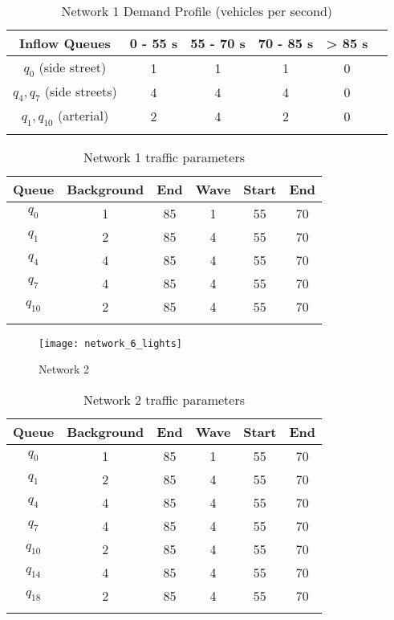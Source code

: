 \begin{table}[h]
\caption{Network 1 Demand Profile (vehicles per second)}
\label{tab:net1wave}
\centering
\begin{tabular}{cccccc}
\toprule
Inflow Queues & 0 - 55 s & 55 - 70 s & 70 - 85 s & > 85 s\\ 
\midrule
$q_0$ (side street)& 1 & 1 & 1 & 0 \\
$q_4, q_7$ (side streets)& 4 & 4 & 4 & 0 \\
$q_1,q_{10}$ (arterial)& 2 & 4 & 2 & 0 \\
\bottomrule\\
\end{tabular}
\end{table}

\begin{table}[h]
\caption{Network 1 traffic parameters}
\label{tab:net1wave_old}
\centering
\begin{tabular}{cccccc}
\toprule
Queue & Background & End & Wave & Start &End\\ 
\midrule
$q_0$ & 1 & 85 & 1 & 55 & 70\\
$q_1$ & 2 & 85 & 4 & 55 & 70\\
$q_4$ & 4 & 85 & 4 & 55 & 70\\
$q_7$ & 4 & 85 & 4 & 55 & 70\\
$q_{10}$ & 2 & 85 & 4 & 55 & 70\\
\bottomrule\\
\end{tabular}
\end{table}


\begin{figure*}[t!]
\centering
\texttt{[image: network\_6\_lights]}
\caption{Network 2}
\label{fig:network6}
\end{figure*}

\begin{table}[h]
\caption{Network 2 traffic parameters}
\label{tab:net2wave}
\centering
\begin{tabular}{cccccc}
\toprule
Queue & Background & End & Wave & Start &End\\ 
\midrule
$q_0$ & 1 & 85 & 1 & 55 & 70\\
$q_1$ & 2 & 85 & 4 & 55 & 70\\
$q_4$ & 4 & 85 & 4 & 55 & 70\\
$q_7$ & 4 & 85 & 4 & 55 & 70\\
$q_{10}$ & 2 & 85 & 4 & 55 & 70\\
$q_{14}$ & 4 & 85 & 4 & 55 & 70\\
$q_{18}$ & 2 & 85 & 4 & 55 & 70\\
\bottomrule\\
\end{tabular}
\end{table}


